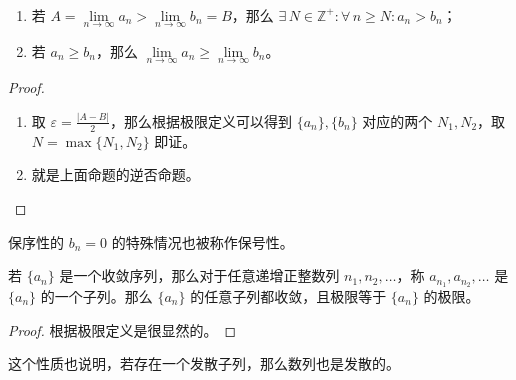 \begin{property}[保序性]
	\ 
	\begin{enumerate}
		\item 若 $A = \lim\limits_{n \to \infty} a_n > \lim\limits_{n \to \infty} b_n = B$，那么 $\exists\,N \in \mathbb{Z}^+: \forall\,n \ge N: a_n > b_n$；
		\item 若 $a_n \ge b_n$，那么 $\lim\limits_{n \to \infty} a_n \ge \lim\limits_{n \to \infty} b_n$。
	\end{enumerate}

	\begin{proof}
		\begin{enumerate}
			\item 取 $\varepsilon = \frac{|A - B|}{2}$，那么根据极限定义可以得到 $\{a_n\},\{b_n\}$ 对应的两个 $N_1,N_2$，取 $N = \max\{N_1,N_2\}$ 即证。
			\item 就是上面命题的逆否命题。
		\end{enumerate}
	\end{proof}
\end{property}

保序性的 $b_n = 0$ 的特殊情况也被称作保号性。

\begin{property}[子列极限一致性]
	若 $\{a_n\}$ 是一个收敛序列，那么对于任意递增正整数列 $n_1,n_2,\dots$，称 $a_{n_1},a_{n_2},\dots$ 是 $\{a_n\}$ 的一个子列。那么 $\{a_n\}$ 的任意子列都收敛，且极限等于 $\{a_n\}$ 的极限。

	\begin{proof}
		根据极限定义是很显然的。
	\end{proof}
\end{property}

这个性质也说明，若存在一个发散子列，那么数列也是发散的。

